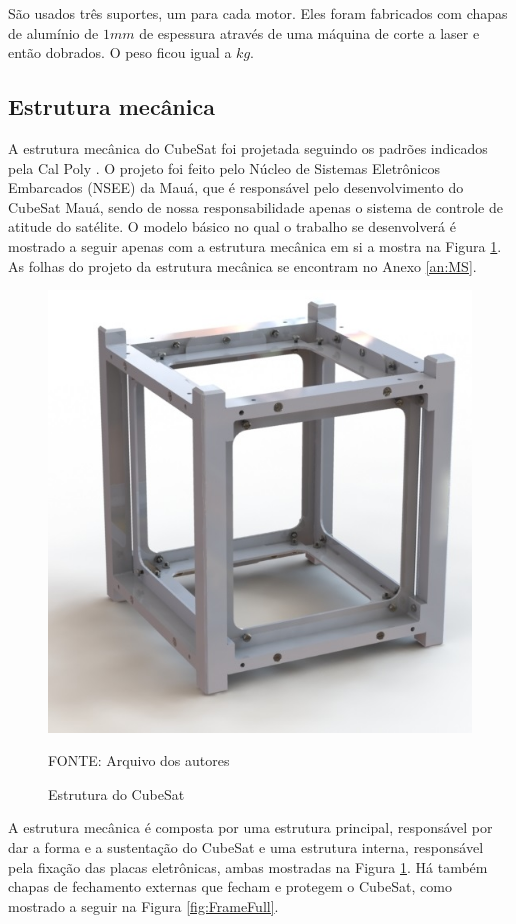 \documentclass[
	12pt,				%
	openany,			%
	twoside,			%
	a4paper,			%
	english,			%
	french,				%
	spanish,			%
	brazil,				%
	oldfontcommands
	]{abntex2}
\begin{document}
São usados três suportes, um para cada motor. Eles foram fabricados com chapas de alumínio de $1mm$ de espessura através de uma máquina de corte a laser e então dobrados. O peso ficou igual a $ kg$.


\subsection{Estrutura mecânica}

A estrutura mecânica do CubeSat foi projetada seguindo os padrões indicados pela Cal Poly \cite{CalPoly}. O projeto foi feito pelo Núcleo de Sistemas Eletrônicos Embarcados (NSEE) da Mauá, que é responsável pelo desenvolvimento do CubeSat Mauá, sendo de nossa responsabilidade apenas o sistema de controle de atitude do satélite. O modelo básico no qual o trabalho se desenvolverá é mostrado a seguir apenas com a estrutura mecânica em si a mostra na Figura \ref{fig:Frame}. As folhas do projeto da estrutura mecânica se encontram no Anexo \ref{an:MS}.

\begin{figure}[th]
	\caption{Estrutura do CubeSat}
	\centering
	\includegraphics[width=0.7\linewidth]{./figs/Frame}
	
	\begin{small}
		FONTE: Arquivo dos autores
	\end{small}
	\label{fig:Frame}
\end{figure}

\newpage

A estrutura mecânica é composta por uma estrutura principal, responsável por dar a forma e a sustentação do CubeSat e uma estrutura interna, responsável pela fixação das placas eletrônicas, ambas mostradas na Figura \ref{fig:Frame}. Há também chapas de fechamento externas que fecham e protegem o CubeSat, como mostrado a seguir na Figura \ref{fig:FrameFull}.
\end{document}
